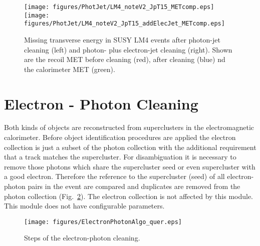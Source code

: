 \documentclass{cmspaper}
\begin{document}
\begin{figure}[hbtp]
  \begin{center}
      \texttt{[image: figures/PhotJet/LM4\_noteV2\_JpT15\_METcomp.eps]}
      \texttt{[image: figures/PhotJet/LM4\_noteV2\_JpT15\_addElecJet\_METcomp.eps]}
    \caption{Missing transverse energy in SUSY LM4 events after photon-jet
    cleaning (left) and photon- plus electron-jet cleaning (right). Shown are
    the recoil MET before cleaning (red), after cleaning (blue) nd the
    calorimeter MET (green).}
    \label{fig:pjLM4MET}
  \end{center}
\end{figure}



\clearpage
\section{Electron - Photon Cleaning}
Both kinds of objects are reconstructed from superclusters in the
electromagnetic calorimeter. Before object identification procedures are
applied the electron collection is just a subset of the photon collection with
the additional requirement that a track matches the supercluster. For
disambiguation it is necessary to remove those photons which share the
supercluster seed or even supercluster with a good electron.  Therefore the
reference to the supercluster (seed) of all electron-photon pairs in the event
are compared and duplicates are removed from the photon collection
(Fig.~\ref{fig:EPCleaning}). The electron collection is not affected by this
module. This module does not have configurable parameters.

\begin{figure}[hbt]
\begin{center}
\texttt{[image: figures/ElectronPhotonAlgo\_quer.eps]}
\caption{Steps of the electron-photon cleaning.}
\label{fig:EPCleaning}
\end{center}
\end{figure}

\end{document}
